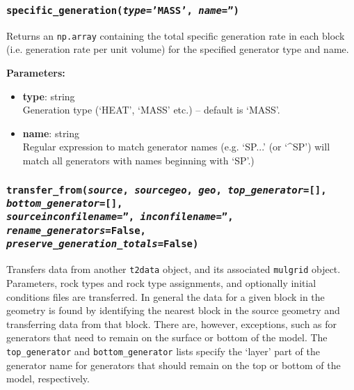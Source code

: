 \begin{snugshade}
\subsubsection{\texttt{specific\_generation(\emph{type}='MASS', \emph{name}='')}}
\end{snugshade}
\label{sec:t2data:specific_generation}

Returns an \texttt{np.array} containing the total specific generation rate in each block (i.e. generation rate per unit volume) for the specified generator type and name.

\textbf{Parameters:}
\begin{itemize}
\item \textbf{type}: string\\
  Generation type (`HEAT', `MASS' etc.) -- default is `MASS'.
\item \textbf{name}: string\\
  Regular expression to match generator names (e.g. `SP...' (or `\^{}SP') will match all generators with names beginning with `SP'.)
\end{itemize}

\begin{snugshade}
\subsubsection{\texttt{transfer\_from(\emph{source}, \emph{sourcegeo}, \emph{geo}, \emph{top\_generator}=[], \emph{bottom\_generator}=[],\\
    \emph{sourceinconfilename}='', \emph{inconfilename}='', \emph{rename\_generators}=False, \\
    \emph{preserve\_generation\_totals}=False)}}
\end{snugshade}
\label{sec:t2data:transfer_from}

Transfers data from another \texttt{t2data} object, and its associated \texttt{mulgrid} object.  Parameters, rock types and rock type assignments, and optionally initial conditions files are transferred.  In general the data for a given block in the geometry is found by identifying the nearest block in the source geometry and transferring data from that block.  There are, however, exceptions, such as for generators that need to remain on the surface or bottom of the model.  The \texttt{top\_generator} and \texttt{bottom\_generator} lists specify the `layer' part of the generator name for generators that should remain on the top or bottom of the model, respectively.

